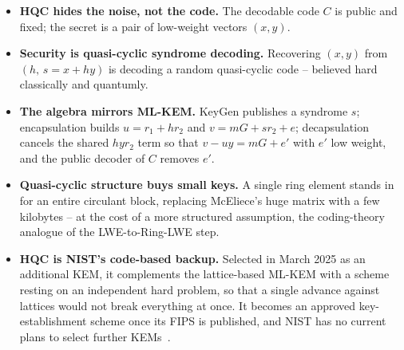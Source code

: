 \begin{itemize}
  \item \textbf{HQC hides the noise, not the code.} The decodable code $C$ is public and fixed; the secret is a pair of low-weight vectors $(x,y)$.
  \item \textbf{Security is quasi-cyclic syndrome decoding.} Recovering $(x,y)$ from $(h,\,s=x+hy)$ is decoding a random quasi-cyclic code -- believed hard classically and quantumly.
  \item \textbf{The algebra mirrors ML-KEM.} KeyGen publishes a syndrome $s$; encapsulation builds $u = r_1 + h r_2$ and $v = mG + s r_2 + e$; decapsulation cancels the shared $h y r_2$ term so that $v - u y = mG + e'$ with $e'$ low weight, and the public decoder of $C$ removes $e'$.
  \item \textbf{Quasi-cyclic structure buys small keys.} A single ring element stands in for an entire circulant block, replacing McEliece's huge matrix with a few kilobytes -- at the cost of a more structured assumption, the coding-theory analogue of the LWE-to-Ring-LWE step.
  \item \textbf{HQC is NIST's code-based backup.} Selected in March 2025 as an additional KEM, it complements the lattice-based ML-KEM with a scheme resting on an independent hard problem, so that a single advance against lattices would not break everything at once. It becomes an approved key-establishment scheme once its FIPS is published, and NIST has no current plans to select further KEMs~\cite{nistir8547}.
\end{itemize}

\printbibliography[heading=chapterrefs]
